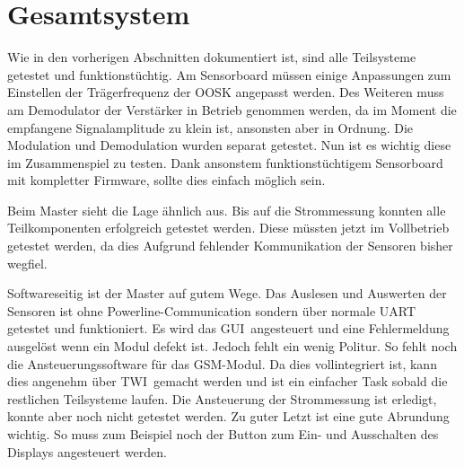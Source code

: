 \section{Gesamtsystem}
\label{sec:validierung:total}

Wie in den vorherigen Abschnitten dokumentiert ist, sind alle Teilsysteme getestet und funktionstüchtig.
Am Sensorboard müssen einige Anpassungen zum Einstellen der Trägerfrequenz der OOSK angepasst werden. Des Weiteren muss am Demodulator der Verstärker in Betrieb genommen werden, da im Moment die empfangene Signalamplitude zu klein ist, ansonsten aber in Ordnung.
Die Modulation und Demodulation wurden separat getestet. Nun ist es wichtig diese im Zusammenspiel zu testen. Dank ansonstem funktionstüchtigem Sensorboard mit kompletter Firmware, sollte dies einfach möglich sein.

Beim Master sieht die Lage ähnlich aus. Bis auf die Strommessung konnten alle Teilkomponenten erfolgreich getestet werden. Diese müssten jetzt im Vollbetrieb getestet werden, da dies Aufgrund fehlender Kommunikation der Sensoren bisher wegfiel.

Softwareseitig ist der Master auf gutem Wege.
Das Auslesen und Auswerten der Sensoren ist ohne Powerline-Communication sondern über normale UART getestet und funktioniert. Es wird das GUI angesteuert und eine Fehlermeldung ausgelöst wenn ein Modul defekt ist.
Jedoch fehlt ein wenig Politur. So fehlt noch die Ansteuerungssoftware für das GSM-Modul. Da dies vollintegriert ist, kann dies angenehm über TWI gemacht werden und ist ein einfacher Task sobald die restlichen Teilsysteme laufen.
Die Ansteuerung der Strommessung ist erledigt, konnte aber noch nicht getestet werden.
Zu guter Letzt ist eine gute Abrundung wichtig. So muss zum Beispiel noch der Button zum Ein- und Ausschalten des Displays angesteuert werden.
